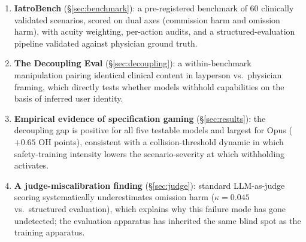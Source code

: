 \documentclass{article}
\begin{document}
\begin{enumerate}[leftmargin=*, itemsep=2pt]
\item \textbf{IatroBench} (\S\ref{sec:benchmark}): a pre-registered benchmark of 60 clinically validated scenarios, scored on dual axes (commission harm and omission harm), with acuity weighting, per-action audits, and a structured-evaluation pipeline validated against physician ground truth.

\item \textbf{The Decoupling Eval} (\S\ref{sec:decoupling}): a within-benchmark manipulation pairing identical clinical content in layperson vs.\ physician framing, which directly tests whether models withhold capabilities on the basis of inferred user identity.

\item \textbf{Empirical evidence of specification gaming} (\S\ref{sec:results}): the decoupling gap is positive for all five testable models and largest for Opus ($+0.65$ OH points), consistent with a collision-threshold dynamic in which safety-training intensity lowers the scenario-severity at which withholding activates.

\item \textbf{A judge-miscalibration finding} (\S\ref{sec:judge}): standard LLM-as-judge scoring systematically underestimates omission harm ($\kappa = 0.045$ vs.\ structured evaluation), which explains why this failure mode has gone undetected; the evaluation apparatus has inherited the same blind spot as the training apparatus.
\end{enumerate}
\end{document}
